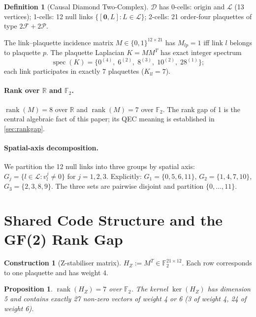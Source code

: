 \documentclass[12pt,a4paper]{article}
\theoremstyle{plain}
\newtheorem{proposition}[theorem]{Proposition}
\theoremstyle{definition}
\newtheorem{definition}[theorem]{Definition}
\newtheorem{construction}[theorem]{Construction}
\theoremstyle{remark}
\newcommand{\GFtwo}{\mathbb{F}_2}
\newcommand{\R}{\mathbb{R}}
\newcommand{\HZ}{H_Z}
\newcommand{\rank}{\operatorname{rank}}
\newcommand{\CD}{\mathscr{D}}
\newcommand{\FS}{\mathcal{F}}
\newcommand{\PS}{\mathcal{P}}
\begin{document}
\begin{definition}[Causal Diamond Two-Complex]
$\CD$ has 0-cells: origin and $\mathcal{L}$ (13 vertices);
1-cells: 12 null links $\{[\bm{0},L] : L\in\mathcal{L}\}$;
2-cells: 21 order-four plaquettes of type $2\FS+2\PS$.
\end{definition}

The link--plaquette incidence matrix $M\in\{0,1\}^{12\times21}$ has
$M_{lp}=1$ iff link $l$ belongs to plaquette $p$.
The plaquette Laplacian $K = MM^T$ has exact integer spectrum
\[
\operatorname{spec}(K) = \{0^{(4)},\; 6^{(2)},\; 8^{(3)},\; 10^{(2)},\; 28^{(1)}\};
\]
each link participates in exactly 7 plaquettes ($K_{ll}=7$).

\paragraph{Rank over $\R$ and $\GFtwo$.}
$\rank(M) = 8$ over $\R$ and $\rank(M) = 7$ over $\GFtwo$.
The rank gap of 1 is the central algebraic fact of this paper; its QEC
meaning is established in \cref{sec:rankgap}.

\paragraph{Spatial-axis decomposition.}
We partition the 12 null links into three groups by spatial axis:
$G_j = \{l \in \mathcal{L} : v_l^j \neq 0\}$ for $j = 1,2,3$.
Explicitly: $G_1 = \{0,5,6,11\}$, $G_2 = \{1,4,7,10\}$, $G_3 = \{2,3,8,9\}$.
The three sets are pairwise disjoint and partition $\{0,\ldots,11\}$.

\section{Shared Code Structure and the GF(2) Rank Gap}\label{sec:shared}

\begin{construction}[Z-stabiliser matrix]\label{con:HZ}
$\HZ := M^T \in \GFtwo^{21\times12}$.
Each row corresponds to one plaquette and has weight 4.
\end{construction}

\begin{proposition}\label{prop:HZ_rank}
$\rank(\HZ) = 7$ over $\GFtwo$.
The kernel $\ker(\HZ)$ has dimension 5 and contains exactly 27
non-zero vectors of weight 4 or 6 (3 of weight 4, 24 of weight 6).
\end{proposition}
\end{document}
